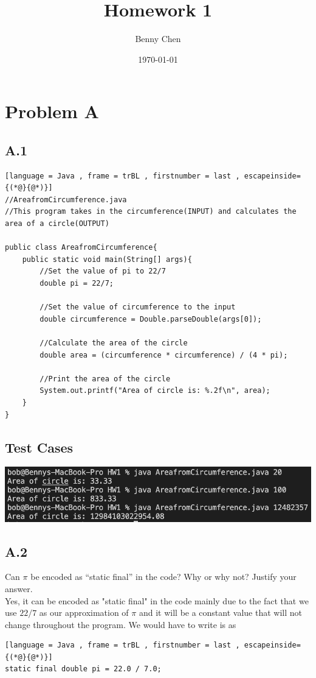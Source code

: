 \documentclass{article}
\title{Homework 1}
\author{Benny Chen}
\date{\today}
\begin{document}
\maketitle

\section{Problem A}

\subsection*{A.1}

\begin{lstlisting}[language = Java , frame = trBL , firstnumber = last , escapeinside={(*@}{@*)}]
//AreafromCircumference.java
//This program takes in the circumference(INPUT) and calculates the area of a circle(OUTPUT)

public class AreafromCircumference{
    public static void main(String[] args){
        //Set the value of pi to 22/7
        double pi = 22/7; 

        //Set the value of circumference to the input
        double circumference = Double.parseDouble(args[0]); 

        //Calculate the area of the circle
        double area = (circumference * circumference) / (4 * pi); 
        
        //Print the area of the circle
        System.out.printf("Area of circle is: %.2f\n", area); 
    }
}
\end{lstlisting}

\subsection*{Test Cases}

\begin{center}
    \includegraphics*[scale = .65]{./images/q1test.png}
\end{center}

\subsection*{A.2}

Can $\pi$ be encoded as “static final” in the code? Why or why not? Justify your answer.
\\
Yes, it can be encoded as "static final" in the code mainly due to the fact that we use $22/7$ as our approximation of $\pi$ and it will be a constant value that will not change throughout the program.
We would have to write is as 
\begin{lstlisting}[language = Java , frame = trBL , firstnumber = last , escapeinside={(*@}{@*)}]
static final double pi = 22.0 / 7.0; 
\end{lstlisting}
\end{document}
